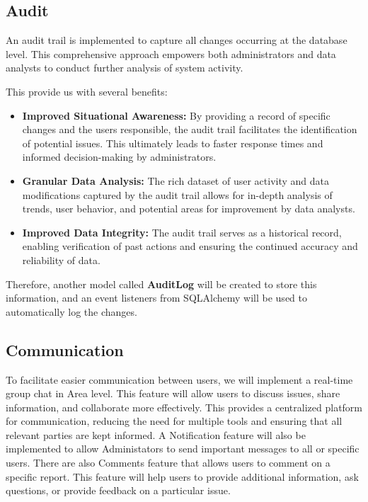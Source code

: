 \subsection{Audit}
\label{subsec:internship_experience:audit}

An audit trail is implemented to capture all changes occurring at the database level. This comprehensive approach empowers both administrators and data analysts to conduct further analysis of system activity.

This provide us with several benefits:

\begin{itemize}
    \item \textbf{Improved Situational Awareness:} By providing a record of specific changes and the users responsible, the audit trail facilitates the identification of potential issues. This ultimately leads to faster response times and informed decision-making by administrators.
    \item \textbf{Granular Data Analysis:} The rich dataset of user activity and data modifications captured by the audit trail allows for in-depth analysis of trends, user behavior, and potential areas for improvement by data analysts.
    \item \textbf{Improved Data Integrity:} The audit trail serves as a historical record, enabling verification of past actions and ensuring the continued accuracy and reliability of data.
\end{itemize}

Therefore, another model called \textbf{AuditLog} will be created to store this information, and an event listeners from SQLAlchemy will be used to automatically log the changes.

\subsection{Communication}
\label{subsec:internship_experience:communication}

To facilitate easier communication between users, we will implement a real-time group chat in Area level. This feature will allow users to discuss issues, share information, and collaborate more effectively. This provides a centralized platform for communication, reducing the need for multiple tools and ensuring that all relevant parties are kept informed. A Notification feature will also be implemented to allow Administators to send important messages to all or specific users. There are also Comments feature that allows users to comment on a specific report. This feature will help users to provide additional information, ask questions, or provide feedback on a particular issue.

